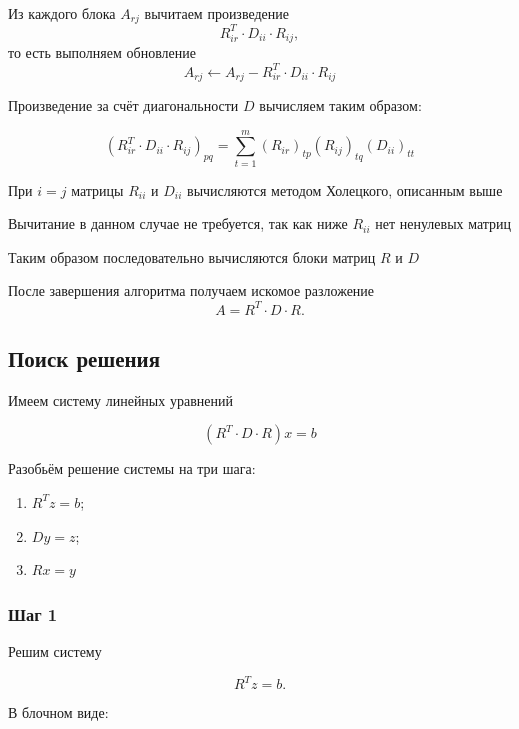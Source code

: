 \documentclass[a4paper,12pt]{article}
\begin{document}
Из каждого блока $A_{rj}$ вычитаем произведение
$$
R_{ir}^{T} \cdot D_{ii} \cdot R_{ij},
$$
то есть выполняем обновление
$$
A_{rj}
\leftarrow
A_{rj}
-
R_{ir}^{T} \cdot D_{ii} \cdot R_{ij}
$$

Произведение за счёт диагональности $D$ вычисляем таким образом:

$$
(R_{ir}^{T} \cdot D_{ii} \cdot R_{ij})_{pq} = \sum_{t = 1}^{m} (R_{ir})_{tp} (R_{ij})_{tq} (D_{ii})_{tt}
$$

При $i=j$ матрицы $R_{ii}$ и $D_{ii}$ вычисляются методом Холецкого,
описанным выше

Вычитание в данном случае не требуется, так как ниже $R_{ii}$ нет ненулевых матриц

Таким образом последовательно вычисляются блоки матриц $R$ и $D$

После завершения алгоритма получаем искомое разложение
$$
A = R^{T} \cdot D \cdot R.
$$

\subsection{Поиск решения}

Имеем систему линейных уравнений

$$
(R^T \cdot D \cdot R)x = b
$$

Разобьём решение системы на три шага:

\begin{enumerate}
  \item $R^T z = b$;
  \item $D y = z$;
  \item $R x = y$
\end{enumerate}


\subsubsection{Шаг 1}

Решим систему

$$
R^T z = b.
$$

В блочном виде:
\end{document}
